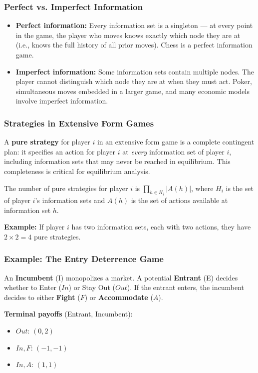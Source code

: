 \documentclass[hidelinks]{article}
\begin{document}
\subsubsection{Perfect vs. Imperfect Information}

\begin{itemize}
    \item \textbf{Perfect information:} Every information set is a singleton — at every point in the game, the player who moves knows exactly which node they are at (i.e., knows the full history of all prior moves). Chess is a perfect information game.
    \item \textbf{Imperfect information:} Some information sets contain multiple nodes. The player cannot distinguish which node they are at when they must act. Poker, simultaneous moves embedded in a larger game, and many economic models involve imperfect information.
\end{itemize}

\subsubsection{Strategies in Extensive Form Games}

A \textbf{pure strategy} for player $i$ in an extensive form game is a complete contingent plan: it specifies an action for player $i$ at \textit{every} information set of player $i$, including information sets that may never be reached in equilibrium. This completeness is critical for equilibrium analysis.

The number of pure strategies for player $i$ is $\prod_{h \in H_i} |A(h)|$, where $H_i$ is the set of player $i$'s information sets and $A(h)$ is the set of actions available at information set $h$.

\textbf{Example:} If player $i$ has two information sets, each with two actions, they have $2 \times 2 = 4$ pure strategies.

\subsubsection{Example: The Entry Deterrence Game}

An \textbf{Incumbent} (I) monopolizes a market. A potential \textbf{Entrant} (E) decides whether to Enter ($In$) or Stay Out ($Out$). If the entrant enters, the incumbent decides to either \textbf{Fight} ($F$) or \textbf{Accommodate} ($A$).

\textbf{Terminal payoffs} (Entrant, Incumbent):
\begin{itemize}
    \item $Out$: $(0, 2)$
    \item $In, F$: $(-1, -1)$
    \item $In, A$: $(1, 1)$
\end{itemize}
\end{document}
